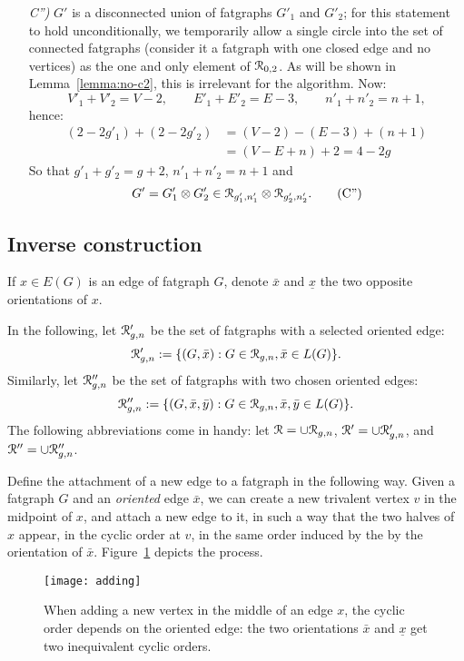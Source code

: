 \begin{enumerate}
\item[\slshape C'')] $G'$ is a disconnected union of fatgraphs $G'_1$ and
  $G'_2$; for this statement to hold unconditionally, we temporarily allow a
  single circle into the set of connected fatgraphs (consider it a fatgraph
  with one closed edge and no vertices) as the one and only element of
  $\mathcal{R}_{0,2}$.  As will be shown in Lemma~\ref{lemma:no-c2}, this is
  irrelevant for the algorithm.  Now:
  \begin{equation*} V'_1 + V'_2 = V -2, 
    \qquad E'_1 + E'_2 = E - 3,
    \qquad n'_1 + n'_2 = n + 1,
  \end{equation*} hence:
\begin{align*} 
  (2- 2g'_1) + (2-2g'_2) &= (V-2) - (E-3) + (n+1) 
  \\ 
  &= (V-E+n) + 2 = 4 - 2g
\end{align*} 
So that $g'_1 + g'_2 = g + 2$, $n'_1 + n'_2 = n+1$ and
\begin{equation} 
  G'= G'_1 \otimes G'_2 \in \mathcal{R}_{g'_1, n'_1} \otimes \mathcal{R}_{g'_2, n'_2}.
  \label{eq:C''}\tag{C''}
\end{equation}
\end{enumerate}

\subsection{Inverse construction}
\label{sec:addition}

If $x \in E(G)$ is an edge of fatgraph $G$, denote $\bar{x}$ and
$\underline{x}$ the two opposite orientations of $x$.

In the following, let $\mathcal{R}'_{g,n}$ be the set of fatgraphs with a
selected oriented edge:
\begin{equation*}
  \mathcal{R}'_{g,n} := \{ (G,\bar x) : G \in \mathcal{R}_{g,n}, \bar{x} \in L(G)\}.
\end{equation*}
Similarly, let $\mathcal{R}''_{g,n}$ be the set of fatgraphs with two
chosen oriented edges:
\begin{equation*}
  \mathcal{R}''_{g,n} := \{ (G, \bar x, \bar y) : G \in \mathcal{R}_{g,n}, 
                   \bar{x}, \bar{y} \in L(G) \}.
\end{equation*}
The following abbreviations come in handy: let $\mathcal{R} = \cup \mathcal{R}_{g,n}$,
$\mathcal{R}' = \cup \mathcal{R}'_{g,n}$, and $\mathcal{R}'' = \cup \mathcal{R}''_{g,n}$.

Define the attachment of a new edge to a fatgraph in the following
way.  Given a fatgraph $G$ and an \emph{oriented} edge $\bar{x}$, we
can create a new trivalent vertex $v$ in the midpoint of $x$, and
attach a new edge to it, in such a way that the two halves of $x$
appear, in the cyclic order at $v$, in the same order induced by the
by the orientation of $\bar{x}$.  Figure~\ref{fig:adding} depicts the process.
\begin{figure}
  \centering
  \texttt{[image: adding]}
  \caption{When adding a new vertex in the middle of an edge $x$, the cyclic order depends on the oriented edge: the two orientations $\bar{x}$ and $\underline{x}$ get two inequivalent cyclic orders.}
  \label{fig:adding}
\end{figure}

